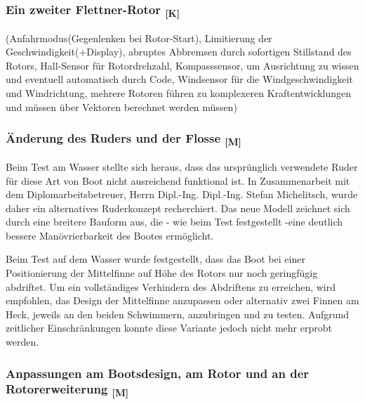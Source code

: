 \documentclass[a4paper,12pt]{article}
\begin{document}
\subsubsection{\texorpdfstring{Ein zweiter Flettner-Rotor \textsubscript{[K]}}{Ein zweiter Flettner-Rotor [K]}}


 
 (Anfahrmodus(Gegenlenken bei Rotor-Start), Limitierung der Geschwindigkeit(+Display), abruptes Abbremsen durch sofortigen Stillstand des Rotors, Hall-Sensor für Rotordrehzahl, Kompasssensor, um Ausrichtung zu wissen und eventuell automatisch durch Code, Windsensor für die Windgeschwindigkeit und Windrichtung, mehrere Rotoren führen zu komplexeren Kraftentwicklungen und müssen über Vektoren berechnet werden müssen)



\subsubsection{\texorpdfstring{Änderung des Ruders und der Flosse \textsubscript{[M]}}{Änderung des Ruders und der Flosse [M]}}
    
Beim Test am Wasser stellte sich heraus, dass das ursprünglich verwendete Ruder für diese Art von Boot nicht ausreichend funktional ist. In Zusammenarbeit mit dem Diplomarbeitsbetreuer, Herrn Dipl.-Ing. Dipl.-Ing. Stefan Michelitsch, wurde daher ein alternatives Ruderkonzept recherchiert. Das neue Modell zeichnet sich durch eine breitere Bauform aus, die - wie beim Test festgestellt -eine deutlich bessere Manövrierbarkeit des Bootes ermöglicht.\cite{Nelo_Ruder_K17}\newline

Beim Test auf dem Wasser wurde festgestellt, dass das Boot bei einer Positionierung der Mittelfinne auf Höhe des Rotors nur noch geringfügig abdriftet. Um ein vollständiges Verhindern des Abdriftens zu erreichen, wird empfohlen, das Design der Mittelfinne anzupassen oder alternativ zwei Finnen am Heck, jeweils an den beiden Schwimmern, anzubringen und zu testen. Aufgrund zeitlicher Einschränkungen konnte diese Variante jedoch nicht mehr erprobt werden.

\subsubsection{\texorpdfstring{Anpassungen am Bootsdesign, am Rotor und an der Rotorerweiterung \textsubscript{[M]}}{Anpassungen am Bootsdesign, am Rotor und an der Rotorerweiterung [M]}}
\end{document}
